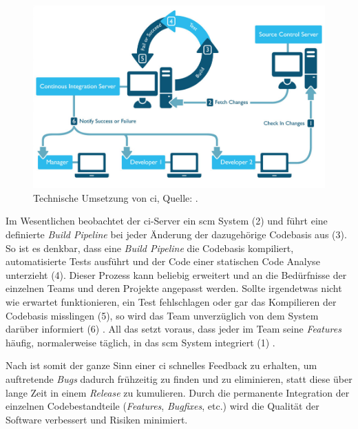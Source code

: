 \begin{figure}[ht!]
\centering
\includegraphics[width=\textwidth]{source/images/ci-flow}
\caption[Technische Umsetzung von \ac{ci}.]{Technische Umsetzung von \ac{ci}, Quelle: \citealt{continuous-improvement}.}
\label{fig:ci-flow}
\end{figure}

Im Wesentlichen beobachtet der \ac{ci}-Server ein \ac{scm} System (2) und führt eine definierte \textit{Build Pipeline} bei jeder Änderung der dazugehörige Codebasis aus (3). So ist es denkbar, dass eine \textit{Build Pipeline} die Codebasis kompiliert, automatisierte Tests ausführt und der Code einer statischen Code Analyse unterzieht (4). Dieser Prozess kann beliebig erweitert und an die Bedürfnisse der einzelnen Teams und deren Projekte angepasst werden. Sollte irgendetwas nicht wie erwartet funktionieren, ein Test fehlschlagen oder gar das Kompilieren der Codebasis misslingen (5), so wird das Team unverzüglich von dem System darüber informiert (6) \citep{jenkins-guide}. 
All das setzt voraus, dass jeder im Team seine \textit{Features} häufig, normalerweise täglich, in das \ac{scm} System integriert (1) \citep{fowler_2006}.

Nach \citet{fowler_2006} ist somit der ganze Sinn einer \ac{ci} schnelles Feedback zu erhalten, um auftretende \textit{Bugs} dadurch frühzeitig zu finden und zu eliminieren, statt diese über lange Zeit in einem \textit{Release} zu kumulieren. Durch die permanente Integration der einzelnen Codebestandteile (\textit{Features}, \textit{Bugfixes}, etc.) wird die Qualität der Software verbessert und Risiken minimiert.

